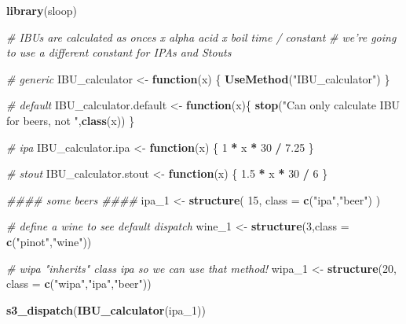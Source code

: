 \documentclass[]{book}
\newenvironment{Shaded}{\begin{snugshade}}{\end{snugshade}}
\newcommand{\CommentTok}[1]{\textcolor[rgb]{0.56,0.35,0.01}{\textit{#1}}}
\newcommand{\ControlFlowTok}[1]{\textcolor[rgb]{0.13,0.29,0.53}{\textbf{#1}}}
\newcommand{\DataTypeTok}[1]{\textcolor[rgb]{0.13,0.29,0.53}{#1}}
\newcommand{\DecValTok}[1]{\textcolor[rgb]{0.00,0.00,0.81}{#1}}
\newcommand{\FloatTok}[1]{\textcolor[rgb]{0.00,0.00,0.81}{#1}}
\newcommand{\KeywordTok}[1]{\textcolor[rgb]{0.13,0.29,0.53}{\textbf{#1}}}
\newcommand{\NormalTok}[1]{#1}
\newcommand{\OperatorTok}[1]{\textcolor[rgb]{0.81,0.36,0.00}{\textbf{#1}}}
\newcommand{\StringTok}[1]{\textcolor[rgb]{0.31,0.60,0.02}{#1}}
\begin{document}
\begin{Shaded}
\begin{Highlighting}[]
\KeywordTok{library}\NormalTok{(sloop)}

\CommentTok{# IBUs are calculated as onces x alpha acid x boil time / constant}
\CommentTok{# we're going to use a different constant for IPAs and Stouts}


\CommentTok{# generic}
\NormalTok{IBU_calculator <-}\StringTok{ }\ControlFlowTok{function}\NormalTok{(x) \{}
  \KeywordTok{UseMethod}\NormalTok{(}\StringTok{"IBU_calculator"}\NormalTok{)}
\NormalTok{\}}

\CommentTok{# default}
\NormalTok{IBU_calculator.default <-}\StringTok{ }\ControlFlowTok{function}\NormalTok{(x)\{}
  \KeywordTok{stop}\NormalTok{(}\StringTok{"Can only calculate IBU for beers, not "}\NormalTok{,}\KeywordTok{class}\NormalTok{(x))}
\NormalTok{\}}

\CommentTok{# ipa}
\NormalTok{IBU_calculator.ipa <-}\StringTok{ }\ControlFlowTok{function}\NormalTok{(x) \{}
  \DecValTok{1} \OperatorTok{*}\StringTok{ }\NormalTok{x }\OperatorTok{*}\StringTok{ }\DecValTok{30} \OperatorTok{/}\StringTok{ }\FloatTok{7.25}
\NormalTok{\}}

\CommentTok{# stout}
\NormalTok{IBU_calculator.stout <-}\StringTok{ }\ControlFlowTok{function}\NormalTok{(x) \{}
  \FloatTok{1.5} \OperatorTok{*}\StringTok{ }\NormalTok{x }\OperatorTok{*}\StringTok{ }\DecValTok{30} \OperatorTok{/}\StringTok{ }\DecValTok{6}
\NormalTok{\}}

\CommentTok{#### some beers ####}
\NormalTok{ipa_}\DecValTok{1}\NormalTok{ <-}\StringTok{ }\KeywordTok{structure}\NormalTok{(}
  \DecValTok{15}\NormalTok{, }\DataTypeTok{class =} \KeywordTok{c}\NormalTok{(}\StringTok{"ipa"}\NormalTok{,}\StringTok{"beer"}\NormalTok{)}
\NormalTok{)}

\CommentTok{# define a wine to see default dispatch}
\NormalTok{wine_}\DecValTok{1}\NormalTok{ <-}\StringTok{ }\KeywordTok{structure}\NormalTok{(}\DecValTok{3}\NormalTok{,}\DataTypeTok{class =} \KeywordTok{c}\NormalTok{(}\StringTok{"pinot"}\NormalTok{,}\StringTok{"wine"}\NormalTok{))}

\CommentTok{# wipa "inherits" class ipa so we can use that method!}
\NormalTok{wipa_}\DecValTok{1}\NormalTok{ <-}\StringTok{ }\KeywordTok{structure}\NormalTok{(}\DecValTok{20}\NormalTok{, }\DataTypeTok{class =} \KeywordTok{c}\NormalTok{(}\StringTok{"wipa"}\NormalTok{,}\StringTok{"ipa"}\NormalTok{,}\StringTok{"beer"}\NormalTok{))}

\KeywordTok{s3_dispatch}\NormalTok{(}\KeywordTok{IBU_calculator}\NormalTok{(ipa_}\DecValTok{1}\NormalTok{))}
\end{Highlighting}
\end{Shaded}
\end{document}
